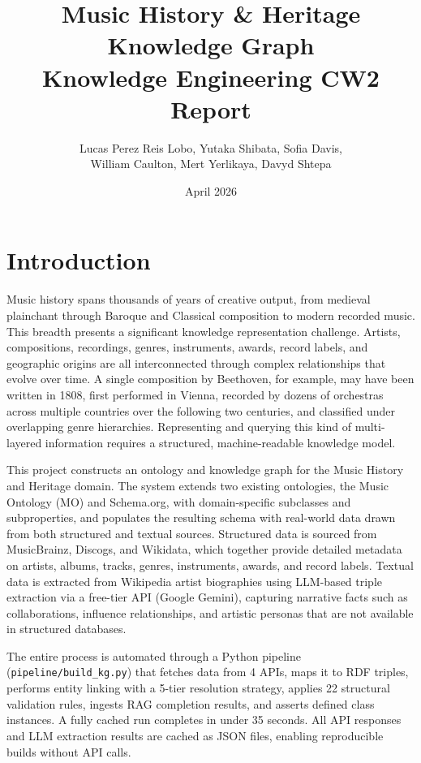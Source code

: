 \documentclass[11pt,a4paper]{article}
\title{Music History \& Heritage Knowledge Graph\\[0.3em]\large Knowledge Engineering CW2 Report}
\author{Lucas Perez Reis Lobo, Yutaka Shibata, Sofia Davis, \\ William Caulton, Mert Yerlikaya, Davyd Shtepa}
\date{April 2026}
\begin{document}
\maketitle

\section{Introduction}

Music history spans thousands of years of creative output, from medieval plainchant through Baroque and Classical composition to modern recorded music. This breadth presents a significant knowledge representation challenge. Artists, compositions, recordings, genres, instruments, awards, record labels, and geographic origins are all interconnected through complex relationships that evolve over time. A single composition by Beethoven, for example, may have been written in 1808, first performed in Vienna, recorded by dozens of orchestras across multiple countries over the following two centuries, and classified under overlapping genre hierarchies. Representing and querying this kind of multi-layered information requires a structured, machine-readable knowledge model.

This project constructs an ontology and knowledge graph for the Music History and Heritage domain. The system extends two existing ontologies, the Music Ontology (MO) and Schema.org, with domain-specific subclasses and subproperties, and populates the resulting schema with real-world data drawn from both structured and textual sources. Structured data is sourced from MusicBrainz, Discogs, and Wikidata, which together provide detailed metadata on artists, albums, tracks, genres, instruments, awards, and record labels. Textual data is extracted from Wikipedia artist biographies using LLM-based triple extraction via a free-tier API (Google Gemini), capturing narrative facts such as collaborations, influence relationships, and artistic personas that are not available in structured databases.

The entire process is automated through a Python pipeline (\texttt{pipeline/build\_kg.py}) that fetches data from 4 APIs, maps it to RDF triples, performs entity linking with a 5-tier resolution strategy, applies 22 structural validation rules, ingests RAG completion results, and asserts defined class instances. A fully cached run completes in under 35 seconds. All API responses and LLM extraction results are cached as JSON files, enabling reproducible builds without API calls.
\end{document}

